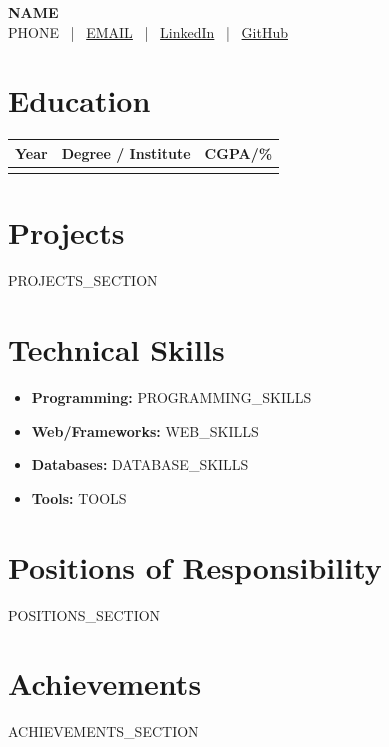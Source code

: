 \documentclass[a4paper,11pt]{article}
\begin{document}
\begin{center}
    {\LARGE\bfseries {{NAME}}} \\[6pt]
    {{PHONE}} \, | \,
    \href{mailto:{{EMAIL}}}{{{EMAIL}}} \, | \,
    \href{https://linkedin.com/in/{{LINKEDIN}}}{LinkedIn} \, | \,
    \href{https://github.com/{{GITHUB}}}{GitHub}
\end{center}
\vspace{-2mm}

\section{Education}
\begin{tabularx}{\textwidth}{|>{\centering\arraybackslash}p{2.5cm}|X|>{\centering\arraybackslash}p{2cm}|}
\hline
\textbf{Year} & \textbf{Degree / Institute} & \textbf{CGPA/\%} \\
\hline
{{EDUCATION_ROWS}}
\hline
\end{tabularx}

\vspace{3mm}

\section{Projects}
\begin{itemize}[leftmargin=*]
{{PROJECTS_SECTION}}
\end{itemize}

\section{Technical Skills}
\begin{itemize}[leftmargin=*]
\item \textbf{Programming:} {{PROGRAMMING_SKILLS}}
\item \textbf{Web/Frameworks:} {{WEB_SKILLS}}
\item \textbf{Databases:} {{DATABASE_SKILLS}}
\item \textbf{Tools:} {{TOOLS}}
\end{itemize}

\section{Positions of Responsibility}
\begin{itemize}[leftmargin=*]
{{POSITIONS_SECTION}}
\end{itemize}

\section{Achievements}
\begin{itemize}[leftmargin=*]
{{ACHIEVEMENTS_SECTION}}
\end{itemize}
\end{document}

